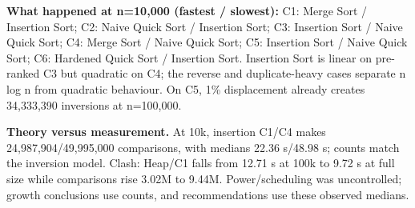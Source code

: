\documentclass[10pt,a4paper]{article}
\begin{document}
\textbf{What happened at n=10,000 (fastest / slowest):} C1: Merge Sort / Insertion Sort; C2: Naive Quick Sort / Insertion Sort; C3: Insertion Sort / Naive Quick Sort; C4: Merge Sort / Naive Quick Sort; C5: Insertion Sort / Naive Quick Sort; C6: Hardened Quick Sort / Insertion Sort. Insertion Sort is linear on pre-ranked C3 but quadratic on C4; the reverse and duplicate-heavy cases separate n log n from quadratic behaviour. On C5, 1\% displacement already creates 34,333,390 inversions at n=100,000.\par

\textbf{Theory versus measurement.} At 10k, insertion C1/C4 makes 24,987,904/49,995,000 comparisons, with medians 22.36 s/48.98 s; counts match the inversion model. Clash: Heap/C1 falls from 12.71 s at 100k to 9.72 s at full size while comparisons rise 3.02M to 9.44M. Power/scheduling was uncontrolled; growth conclusions use counts, and recommendations use these observed medians.\par
\end{document}
